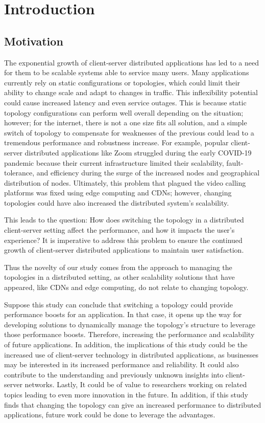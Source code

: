 

\section{Introduction}

\subsection{Motivation}

\indent The exponential growth of client-server distributed applications has led to a need for them to be scalable systems able to service many users. Many applications currently rely on static configurations or topologies, which could limit their ability to change scale and adapt to changes in traffic. This inflexibility potential could cause increased latency and even service outages. This is because static topology configurations can perform well overall depending on the situation; however; for the internet, there is not a one size fits all solution, and a simple switch of topology to compensate for weaknesses of the previous could lead to a tremendous performance and robustness increase. For example, popular client-server distributed applications like Zoom struggled during the early COVID-19 pandemic because their current infrastructure limited their scalability, fault-tolerance, and efficiency during the surge of the increased nodes and geographical distribution of nodes. Ultimately, this problem that plagued the video calling platforms was fixed using edge computing and CDNs; however, changing topologies could have also increased the distributed system's scalability.

This leads to the question: How does switching the topology in a distributed client-server setting affect the performance, and how it impacts the user's experience? It is imperative to address this problem to ensure the continued growth of client-server distributed applications to maintain user satisfaction. 

Thus the novelty of our study comes from the approach to managing the topologies in a distributed setting, as other scalability solutions that have appeared, like CDNs and edge computing, do not relate to changing topology.

Suppose this study can conclude that switching a topology could provide performance boosts for an application. In that case, it opens up the way for developing solutions to dynamically manage the topology's structure to leverage those performance boosts. Therefore, increasing the performance and scalability of future applications. In addition, the implications of this study could be the increased use of client-server technology in distributed applications, as businesses may be interested in its increased performance and reliability. It could also contribute to the understanding and previously unknown insights into client-server networks. Lastly, It could be of value to researchers working on related topics leading to even more innovation in the future. In addition, if this study finds that changing the topology can give an increased performance to distributed applications, future work could be done to leverage the advantages.


